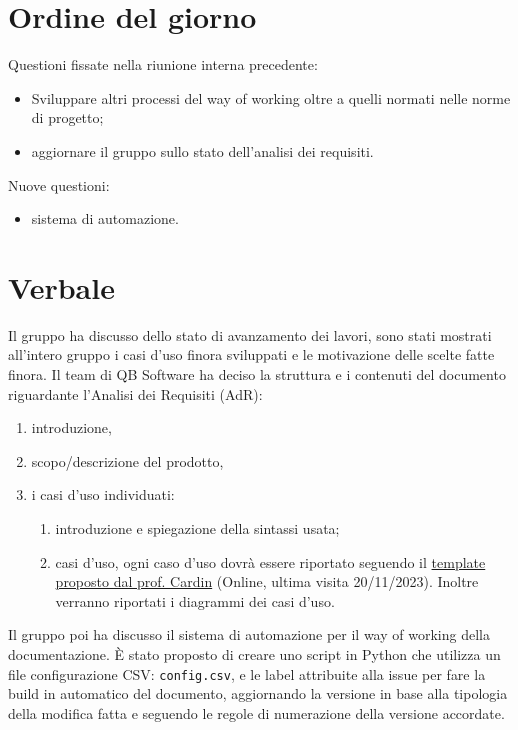 \documentclass[12pt]{article}
\begin{document}
    \section{Ordine del giorno}
    Questioni fissate nella riunione interna precedente:
    \begin{itemize}
    	\item Sviluppare altri processi del way of working oltre a quelli normati nelle norme
    	di progetto;
    	\item aggiornare il gruppo sullo stato dell’analisi dei requisiti.
    \end{itemize}
    
    Nuove questioni:
    \begin{itemize}
    	\item sistema di automazione.
    \end{itemize}
    
    \section{Verbale}
    Il gruppo ha discusso dello stato di avanzamento dei lavori, sono stati mostrati all'intero gruppo i casi d'uso finora sviluppati e le motivazione delle scelte fatte finora. Il team di QB Software ha deciso la struttura e i contenuti del documento riguardante l'Analisi dei Requisiti (AdR):
    \begin{enumerate}
    	\item introduzione,
    	\item scopo/descrizione del prodotto,
    	\item i casi d'uso individuati:
    	\begin{enumerate}
    		\item introduzione e spiegazione della sintassi usata;
    		\item casi d'uso, ogni caso d'uso dovrà essere riportato seguendo il \href{https://github.com/rcardin/swe-imdb/blob/main/use-cases/template.md}{template proposto dal prof. Cardin} (Online, ultima visita 20/11/2023). Inoltre verranno riportati i diagrammi dei casi d'uso.
    	\end{enumerate}
    \end{enumerate}
    \noindent
    Il gruppo poi ha discusso il sistema di automazione per il way of working della documentazione. È stato proposto di creare uno script in Python che utilizza un file configurazione CSV: \verb|config.csv|, e le label attribuite alla issue per fare la build in automatico del documento, aggiornando la versione in base alla tipologia della modifica fatta e seguendo le regole di numerazione della versione accordate.
     
\end{document}
